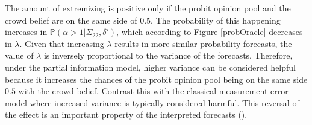 \documentclass[11pt]{article}
\renewcommand{\P}{\mathbb{P}}
\theoremstyle{definition}
\theoremstyle{definition}
\begin{document}


The amount of extremizing is positive only if the probit opinion pool and the crowd belief are on the same side of $0.5$. The probability of this happening increases in $\P(\alpha > 1 | \Sigma_{22}, \delta')$, which according to Figure \ref{probOracle} decreases in $\lambda$. Given that increasing $\lambda$ results in more similar probability forecasts, the value of $\lambda$ is inversely proportional to the variance of the forecasts. Therefore,  under the partial information model, higher variance can be considered helpful because it increases the chances of the probit opinion pool being on the same side $0.5$ with the crowd belief. Contrast this with the classical measurement error model where increased variance is typically considered harmful. This reversal of the effect is an important property of the interpreted forecasts (\citet{hong2009interpreted}). 

\end{document}
